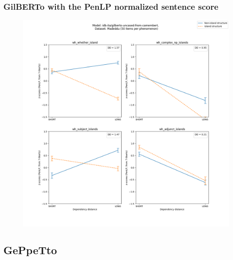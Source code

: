 \subsubsection{GilBERTo with the PenLP normalized sentence score}
\begin{figure}[h]
	\centering
	\includegraphics[width=1\textwidth]{images/AppendixA/Madeddu_wh_idb-ita_gilberto-uncased-from-camembert_PenLP-zscores-likert-2022-09-16_h10m26s47.png} 
	\label{A-fig:md_gilberto_penlp}
	\caption{}
\end{figure}

\clearpage
\subsection{GePpeTto}
